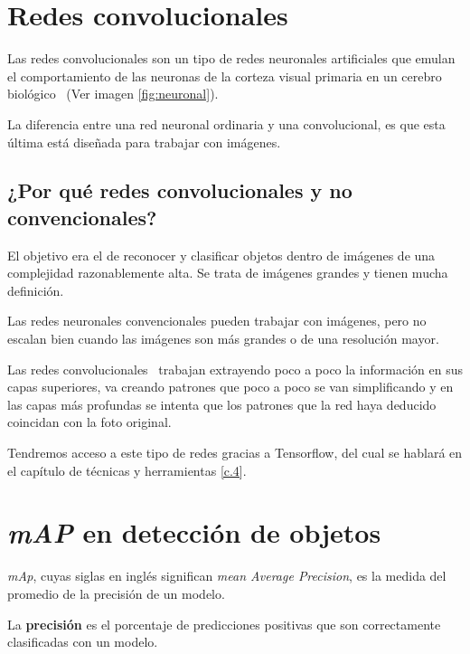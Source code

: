 \section{Redes convolucionales}

Las redes convolucionales son un tipo de redes neuronales artificiales que emulan el comportamiento de las neuronas de la corteza visual primaria en un cerebro biológico~\cite{redes} (Ver imagen \ref{fig:neuronal}).

La diferencia entre una red neuronal ordinaria y una convolucional, es que esta última está diseñada para trabajar con imágenes.

\subsection{¿Por qué redes convolucionales y no convencionales?}

El objetivo era el de reconocer y clasificar objetos dentro de imágenes de una complejidad razonablemente alta.
Se trata de imágenes grandes y tienen mucha definición.

Las redes neuronales convencionales pueden trabajar con imágenes, pero no escalan bien cuando las imágenes son más grandes o de una resolución mayor.

Las redes convolucionales~\cite{neurona} trabajan extrayendo poco a poco la información en sus capas superiores, va creando patrones que poco a poco se van simplificando y en las capas más profundas se intenta que los patrones que la red haya deducido coincidan con la foto original.

Tendremos acceso a este tipo de redes gracias a Tensorflow, del cual se hablará en el capítulo de técnicas y herramientas \ref{c.4}.




\section{\textit{mAP} en detección de objetos}

\textit{mAp}, cuyas siglas en inglés significan  \textit{mean Average Precision}, es la medida del promedio de la precisión de un modelo.

La \textbf{precisión} es el porcentaje de predicciones positivas que son correctamente clasificadas con un modelo.

